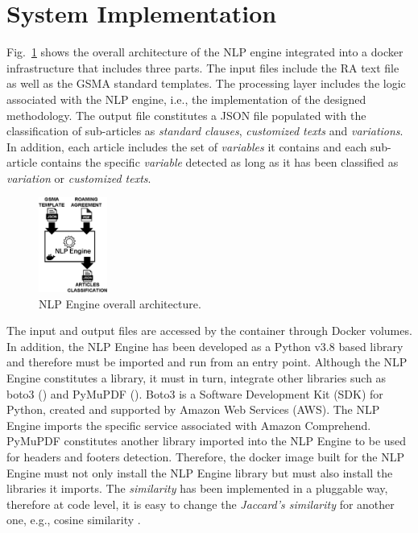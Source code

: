 \section{System Implementation}\label{implementation}
Fig.~\ref{fig2} shows the overall architecture of the NLP engine integrated into a docker infrastructure that includes three parts. The input files include the RA text file as well as the GSMA standard templates. The processing layer includes the logic associated with the NLP engine, i.e., the implementation of the designed methodology. The output file constitutes a JSON file populated with the classification of sub-articles as \textit{standard clauses}, \textit{customized texts} and \textit{variations}. In addition, each article includes the set of \textit{variables} it contains and each sub-article contains the specific \textit{variable} detected as long as it has been classified as \textit{variation} or \textit{customized texts}.

\begin{figure}[htbp]
\centerline{\includegraphics[width=0.20\textwidth]{images/NLP_Engine.png}}
\caption{NLP Engine overall architecture.}
\label{fig2}
\end{figure}

The input and output files are accessed by the container through Docker volumes. In addition, the NLP Engine has been developed as a Python v3.8 based library and therefore must be imported and run from an entry point. Although the NLP Engine constitutes a library, it must in turn, integrate other libraries such as boto3 (\cite{boto3}) and PyMuPDF (\cite{PyMuPDF}). Boto3 is a Software Development Kit (SDK) for Python, created and supported by Amazon Web Services (AWS). The NLP Engine imports the specific service associated with Amazon Comprehend. PyMuPDF constitutes another library imported into the NLP Engine to be used for headers and footers detection. Therefore, the docker image built for the NLP Engine must not only install the NLP Engine library but must also install the libraries it imports. The \textit{similarity} has been implemented in a pluggable way, therefore at code level, it is easy to change the \textit{Jaccard's similarity} for another one, e.g., cosine similarity \cite{Gupta2018}.

